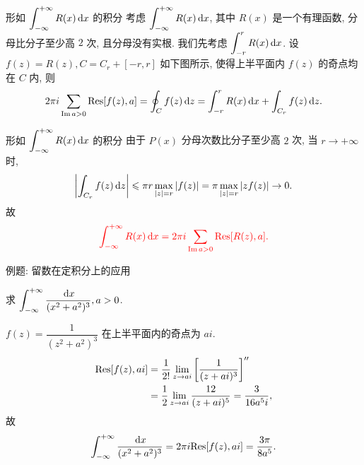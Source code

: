 \begin{frame}{形如 $\displaystyle\int_{-\infty}^{+\infty}R(x)\,\mathrm{d} x$ 的积分}
\onslide<+->
考虑 $\displaystyle\int_{-\infty}^{+\infty}R(x)\,\mathrm{d} x$, 其中 $R(x)$ 是一个有理函数, 分母比分子至少高 $2$ 次, 且分母没有实根.
\onslide<+->
我们先考虑 $\displaystyle\int_{-r}^rR(x)\,\mathrm{d} x$.
\onslide<+->
设 $f(z)=R(z),C=C_r+[-r,r]$ 如下图所示, 使得上半平面内 $f(z)$ 的奇点均在 $C$ 内,
\onslide<+->
则
\[2\pi i\sum_{\operatorname{Im} a>0}{\mathrm{Res}}[f(z),a]=\oint_Cf(z)\,\mathrm{d} z=\int_{-r}^rR(x)\,\mathrm{d} x+\int_{C_r}f(z)\,\mathrm{d} z.\]
\begin{center}
\end{center}
\end{frame}


\begin{frame}{形如 $\displaystyle\int_{-\infty}^{+\infty}R(x)\,\mathrm{d} x$ 的积分}
\onslide<+->
由于 $P(x)$ 分母次数比分子至少高 $2$ 次,
\onslide<+->
当 $r\to+\infty$ 时,
\[\left|\int_{C_r}f(z)\,\mathrm{d} z\right|\leqslant \pi r\max_{|z|=r}|f(z)|
=\pi \max_{|z|=r}|zf(z)|\to 0.\]
\onslide<+->
故
\[{\color{red}{\int_{-\infty}^{+\infty}R(x)\,\mathrm{d}x=2\pi i\sum_{\operatorname{Im}a>0}{\mathrm{Res}}[R(z),a].}}\]
\end{frame}


\begin{frame}{例题: 留数在定积分上的应用}
\begin{example}
求 $\displaystyle\int_{-\infty}^{+\infty}\frac{\,\mathrm{d} x}{(x^2+a^2)^3},a>0$.
\end{example}

\begin{solution}
$f(z)=\dfrac1{(z^2+a^2)^3}$ 在上半平面内的奇点为 $ai$.
\vspace{-0.7\baselineskip}
\onslide<+->
\begin{align*}
{\mathrm{Res}}[f(z),ai]&=\frac1{2!}\lim_{z\to ai}\left[\frac1{(z+ai)^3}\right]''\\
&=\frac12\lim_{z\to ai}\frac{12}{(z+ai)^5}=\frac{3}{16a^5i},
\end{align*}
\onslide<+->
故
\[\int_{-\infty}^{+\infty}\frac{\,\mathrm{d} x}{(x^2+a^2)^3}
=2\pi i{\mathrm{Res}}[f(z),ai]=\frac{3\pi}{8a^5}.\]
\end{solution}
\end{frame}


